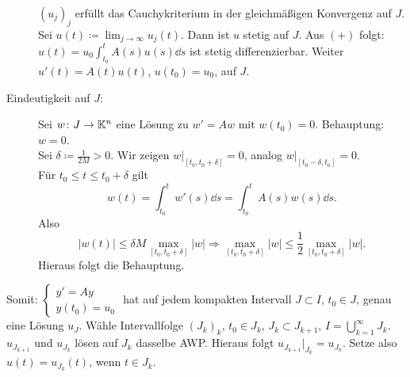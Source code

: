 \begin{beweis}
\begin{description}
		$ (u_j)_j $ erf\"ullt das Cauchykriterium in der gleichm\"a\ss igen Konvergenz auf $ J $.\\
		Sei $ u(t)\coloneqq\lim_{j\to\infty}u_j(t) $. Dann ist $ u $ stetig auf $ J $. Aus $ (+) $ folgt: $ u(t)=u_0\int_{t_0}^t A(s)u(s)\dd s $ ist stetig differenzierbar. Weiter $ u'(t)=A(t)u(t) $, $ u(t_0)=u_0 $, auf $ J $.
		\item[Eindeutigkeit auf $ J $:] Sei $ w\colon J\rightarrow\mathbb{K}^n $ eine L\"osung zu $ w'=Aw $ mit $ w(t_0)=0 $. Behauptung: $ w=0 $.\\
		Sei $ \delta\coloneqq\frac{1}{2M}>0 $. Wir zeigen $ w|_{[t_0,t_0+\delta]}=0 $, analog $ w|_{[t_0-\delta,t_0]}=0 $.\\
		F\"ur $ t_0\leq t\leq t_0+\delta $ gilt \[ w(t)=\int_{t_0}^t w'(s)\dd s=\int_{t_0}^t A(s)w(s)\dd s. \]
		Also
		\[ |w(t)|\leq\delta M\max_{[t_0,t_0+\delta]}|w|\Rightarrow \max_{[t_0,t_0+\delta]}|w|\leq\frac{1}{2}\max_{[t_0,t_0+\delta]}|w|. \]
		Hieraus folgt die Behauptung.
	\end{description}

\end{beweis}
Somit: $\begin{cases}
y'=Ay\\y(t_0)=u_0
\end{cases}$ hat auf jedem kompakten Intervall $ J\subset I $, $ t_0\in J $, genau eine L\"osung $ u_J $. W\"ahle Intervallfolge $ (J_k)_k $, $ t_0\in J_k $, $ J_k\subset J_{k+1} $, $ I=\bigcup_{k=1}^\infty J_k $. $ u_{J_{k+1}} $ und $ u_{J_k} $ l\"osen auf $ J_k $ dasselbe AWP. Hieraus folgt $ u_{J_{k+1}}|_{J_k}=u_{J_k} $. Setze also $ u(t)=u_{J_k}(t) $, wenn $ t\in J_k $.
%
%
%
%
%
